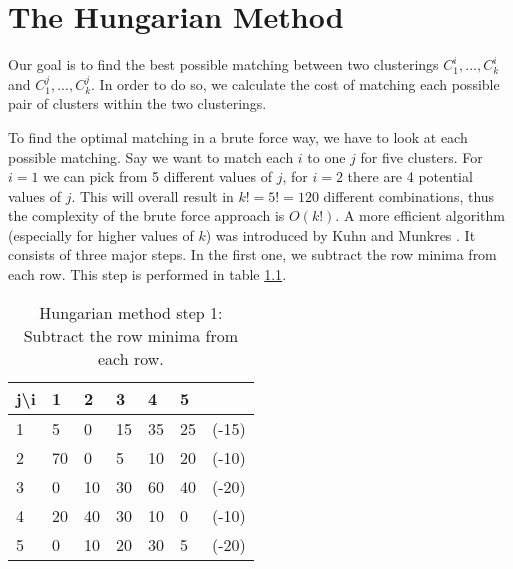 \chapter{The Hungarian Method}
\label{sec:hungarian}

Our goal is to find the best possible matching between two clusterings $C_1^i, ..., C_k^i$ and $C_1^j, ..., C_k^j$. In order to do so, we calculate the cost of matching each possible pair of clusters within the two clusterings. 


To find the optimal matching in a brute force way, we have to look at each possible matching. Say we want to match each $i$ to one $j$ for five clusters. For $i = 1$ we can pick from 5 different values of $j$, for $i = 2$ there are 4 potential values of $j$. This will overall result in $k! = 5! = 120$ different combinations, thus the complexity of the brute force approach is $O(k!)$. A more efficient algorithm (especially for higher values of $k$) was introduced by Kuhn and Munkres \cite{kuhn1955hungarian}\cite{munkres1957algorithms}. It consists of three major steps. In the first one, we subtract the row minima from each row. This step is performed in table \ref{app:hung:step1}.

\begin{table}[h]
    \centering
    \begin{tabular}{|l | l l l l l| l |}
    \hline
    j\textbackslash i & 1 & 2 & 3 & 4 & 5 & \\ \hline
    1 & 5 & 0 & 15 & 35 & 25 & (-15)\\
    2 & 70 & 0 & 5 & 10 & 20 & (-10)\\
    3 & 0 & 10 & 30 & 60 & 40 & (-20)\\
    4 & 20 & 40 & 30 & 10 & 0 & (-10)\\
    5 & 0 & 10 & 20 & 30 & 5 & (-20)\\ \hline
    \end{tabular}
    \caption{Hungarian method step 1: Subtract the row minima from each row.}
    \label{app:hung:step1}
\end{table}

